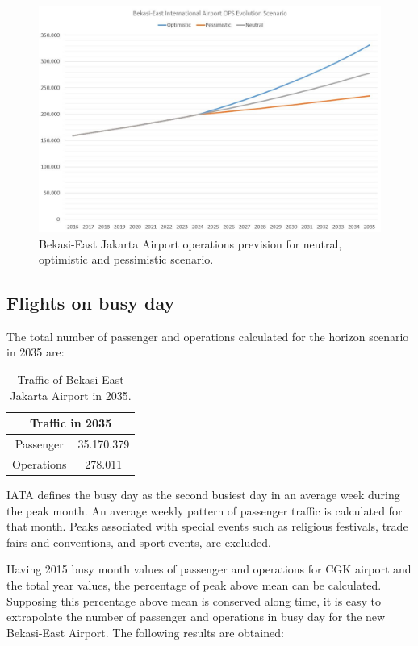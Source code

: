 \begin{figure}[H]
	\centering
	\includegraphics[clip, trim=0cm 0cm 0cm 0cm, width=1\textwidth]{./images/PROGNOSIS/TrafficForecast/BE_OPS_Prev_NEUOPTPES}
	\caption{Bekasi-East Jakarta Airport operations prevision for neutral, optimistic and pessimistic scenario.}
	\label{BE_OPS_Prev_NEUOPTPES}
\end{figure}
	
	\subsection{Flights on busy day}
The total number of passenger and operations calculated for the horizon scenario in 2035 are:

\begin{table}[ht!]
	\label{table:'Traffic2035'}
	\centering
\begin{tabular}{|c|c|}
	\hline 
	\multicolumn{2}{|c|}{\textbf{Traffic in 2035}}\tabularnewline
	\hline  
	Passenger & 35.170.379 \tabularnewline
	\hline 
	Operations & 278.011 \tabularnewline
	\hline 
\end{tabular}
	\caption{Traffic of Bekasi-East Jakarta Airport in 2035.}
\end{table}

IATA defines the busy day as the second busiest day in an average week during the peak month. An average weekly pattern of passenger traffic is calculated for that month. Peaks associated with special events such as religious festivals, trade fairs and conventions, and sport events, are excluded.

Having 2015 busy month values of passenger and operations for CGK airport and the total year values, the percentage of peak above mean can be calculated. Supposing this percentage above mean is conserved along time, it is easy to extrapolate the number of passenger and operations in busy day for the new Bekasi-East Airport. The following results are obtained:

